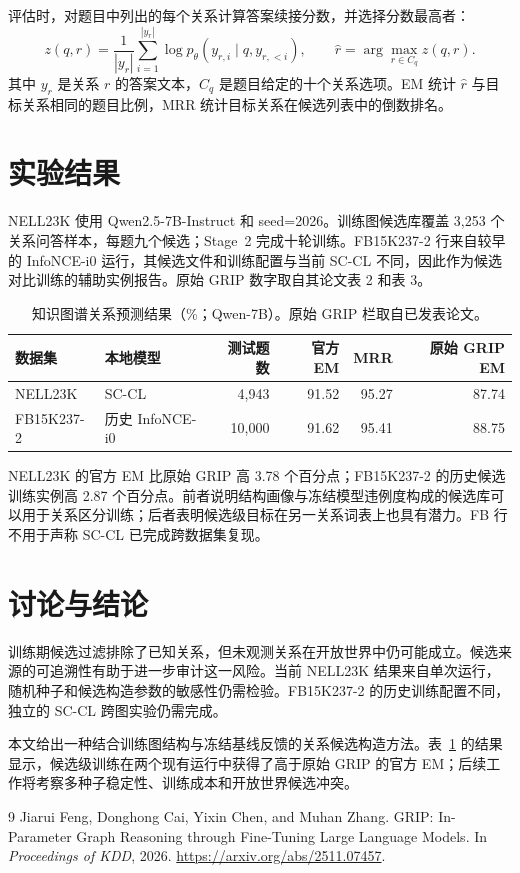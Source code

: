 \documentclass{article}
\newcommand{\scc}{\textsc{SC-CL}}
\begin{document}
评估时，对题目中列出的每个关系计算答案续接分数，并选择分数最高者：
\begin{equation}
z(q,r)=\frac{1}{|y_r|}\sum_{i=1}^{|y_r|}\log p_{\theta}(y_{r,i}\mid q,y_{r,<i}),\qquad
\hat r=\arg\max_{r\in C_q}z(q,r).
\end{equation}
其中 $y_r$ 是关系 $r$ 的答案文本，$C_q$ 是题目给定的十个关系选项。EM 统计 $\hat r$ 与目标关系相同的题目比例，MRR 统计目标关系在候选列表中的倒数排名。

\section{实验结果}
NELL23K 使用 Qwen2.5-7B-Instruct 和 seed=2026。训练图候选库覆盖 3,253 个关系问答样本，每题九个候选；Stage~2 完成十轮训练。FB15K237-2 行来自较早的 InfoNCE-i0 运行，其候选文件和训练配置与当前 \scc{} 不同，因此作为候选对比训练的辅助实例报告。原始 GRIP 数字取自其论文表 2 和表 3\cite{feng2026grip}。

\begin{table}[h]
\caption{知识图谱关系预测结果（\%；Qwen-7B）。原始 GRIP 栏取自已发表论文。}
\label{tab:results}
\centering
\begin{tabular}{l l r r r r}
\toprule
数据集 & 本地模型 & 测试题数 & 官方 EM & MRR & 原始 GRIP EM \\
\midrule
NELL23K & \scc{} & 4,943 & 91.52 & 95.27 & 87.74 \\
FB15K237-2 & 历史 InfoNCE-i0 & 10,000 & 91.62 & 95.41 & 88.75 \\
\bottomrule
\end{tabular}
\end{table}

NELL23K 的官方 EM 比原始 GRIP 高 3.78 个百分点；FB15K237-2 的历史候选训练实例高 2.87 个百分点。前者说明结构画像与冻结模型违例度构成的候选库可以用于关系区分训练；后者表明候选级目标在另一关系词表上也具有潜力。FB 行不用于声称 \scc{} 已完成跨数据集复现。

\section{讨论与结论}
训练期候选过滤排除了已知关系，但未观测关系在开放世界中仍可能成立。候选来源的可追溯性有助于进一步审计这一风险。当前 NELL23K 结果来自单次运行，随机种子和候选构造参数的敏感性仍需检验。FB15K237-2 的历史训练配置不同，独立的 \scc{} 跨图实验仍需完成。

本文给出一种结合训练图结构与冻结基线反馈的关系候选构造方法。表~\ref{tab:results} 的结果显示，候选级训练在两个现有运行中获得了高于原始 GRIP 的官方 EM；后续工作将考察多种子稳定性、训练成本和开放世界候选冲突。

\begin{thebibliography}{9}
 Jiarui Feng, Donghong Cai, Yixin Chen, and Muhan Zhang. GRIP: In-Parameter Graph Reasoning through Fine-Tuning Large Language Models. In \emph{Proceedings of KDD}, 2026. \url{https://arxiv.org/abs/2511.07457}.
\end{thebibliography}
\end{document}
